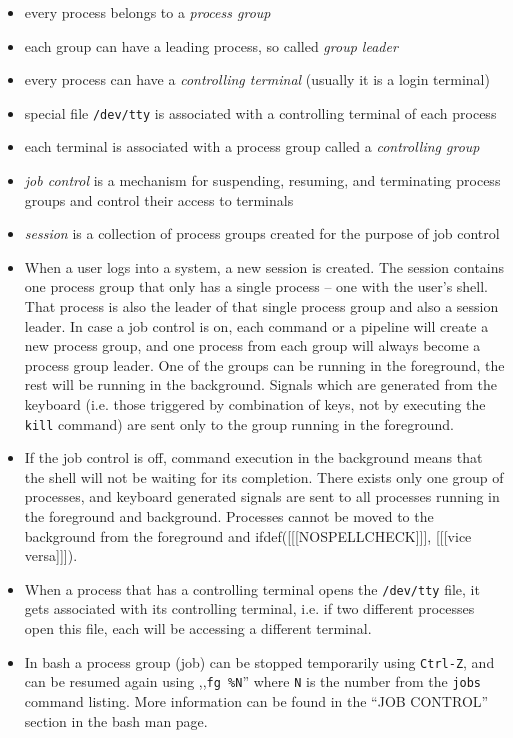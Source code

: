 

\begin{slide}
\begin{itemize}
\item every process belongs to a \emph{process group}
\item each group can have a leading process, so called \emph{group leader}
\item every process can have a \emph{controlling terminal} (usually it is a
login terminal)
\item special file \texttt{/dev/tty} is associated with a controlling terminal
of each process
\item each terminal is associated with a process group called a
\emph{controlling group}
\item \emph{job control} is a mechanism for suspending, resuming, and
terminating process groups and control their access to terminals
\item \emph{session} is a collection of process groups created for the purpose
of job control
\end{itemize}
\end{slide}

\begin{itemize}
\item When a user logs into a system, a new session is created.  The session
contains one process group that only has a single process -- one with the user's
shell.  That process is also the leader of that single process group and also a
session leader.  In case a job control is on, each command or a pipeline will
create a new process group, and one process from each group will always become a
process group leader.  One of the groups can be running in the foreground, the
rest will be running in the background.  Signals which are generated from the
keyboard (i.e. those triggered by combination of keys, not by executing the
\texttt{kill} command) are sent only to the group running in the foreground.
\item If the job control is off, command execution in the background means that
the shell will not be waiting for its completion.  There exists only one group of
processes, and keyboard generated signals are sent to all processes running in
the foreground and background.  Processes cannot be moved to the background from
the foreground and ifdef([[[NOSPELLCHECK]]], [[[vice versa]]]).
\item When a process that has a controlling terminal opens the \texttt{/dev/tty}
file, it gets associated with its controlling terminal, i.e. if two different
processes open this file, each will be accessing a different terminal.
\item In bash a process group (job) can be stopped temporarily using
\texttt{Ctrl-Z}, and can be resumed again using ,,\texttt{fg \%N}'' where
\texttt{N} is the number from the \texttt{jobs} command listing.  More
information can be found in the ``JOB CONTROL'' section in the bash man page.
\end{itemize}


